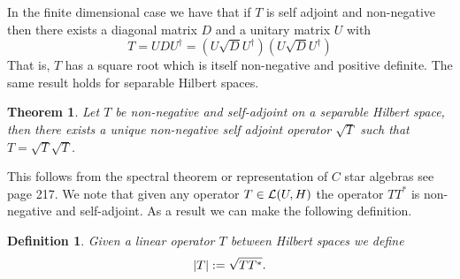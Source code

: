 \documentclass[12pt]{article}
\newtheorem{theorem}{Theorem}
\newtheorem{definition}{Definition}
\begin{document}
In the finite dimensional case we have that if $T$ is self adjoint and non-negative then there exists a diagonal matrix $D$ and a unitary matrix $U$ with
\begin{equation*}
    T=UDU^\dagger=(U\sqrt{D}U^\dagger)(U\sqrt{D}U^\dagger)
\end{equation*}
That is, $T$ has a square root which is itself non-negative and positive definite. The same result holds for separable Hilbert spaces.
\begin{theorem}
    Let $T$ be non-negative and self-adjoint on a separable Hilbert space, then there exists a unique non-negative self adjoint operator $\sqrt{T}$ such that $T=\sqrt{T}\sqrt{T}$.
\end{theorem}
This follows from the spectral theorem or representation of $C$ star algebras see \cite{lototsky2017stochastic} page 217. We note that given any operator $T\in \mathcal{L}(U,H)$ the operator $TT^*$ is non-negative and self-adjoint. As a result we can make the following definition.
\begin{definition}
    Given a linear operator $T$ between Hilbert spaces we define
    \begin{equation*}
        \abs{T}:=\sqrt{T T^*}  .
    \end{equation*}

\end{definition}
\end{document}
